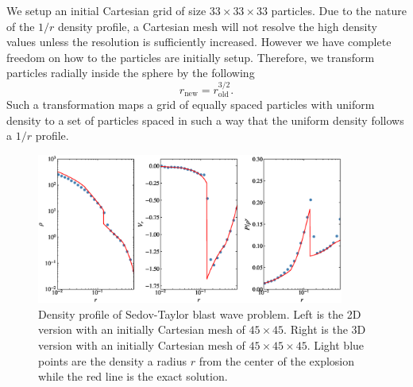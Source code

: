 We setup an initial Cartesian grid of size $33\times 33\times 33$ particles. Due to the nature
of the $1/r$ density profile, a Cartesian mesh will not resolve the high density values unless
the resolution is sufficiently increased. However we have complete freedom on how to the particles
are initially setup. Therefore, we transform particles radially inside the sphere by the following
\begin{equation}
    r_{\mathrm{new}} = r_{\mathrm{old}}^{3/2}.
\end{equation}
Such a transformation maps a grid of equally spaced particles with uniform density to
a set of particles spaced in such a way that the uniform density follows a $1/r$ profile. 
\begin{figure}
    \begin{center}
        \includegraphics[width=0.9\textwidth]{figures/evrard.eps}
        \caption{Density profile of Sedov-Taylor blast wave problem. Left is the 2D version with an initially
        Cartesian mesh of $45 \times 45$. Right is the 3D version with an initially Cartesian mesh of 
        $45 \times 45 \times 45$. Light blue points are the density a radius $r$ from the center of the explosion
        while the red line is the exact solution.}
        \label{fig.evrard}
    \end{center}
\end{figure}

